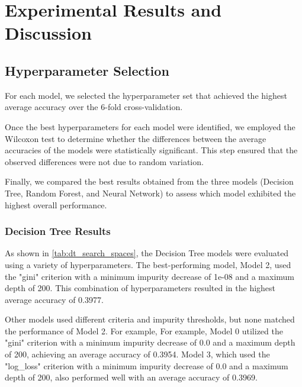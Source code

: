 \section{Experimental Results and Discussion}

\subsection{Hyperparameter Selection}

For each model, we selected the hyperparameter set 
that achieved the highest average accuracy 
over the 6-fold cross-validation. 

Once the best hyperparameters for each model were 
identified, we employed the Wilcoxon test to determine 
whether the differences between the average accuracies 
of the models were statistically significant. 
This step ensured that the observed differences 
were not due to random variation. 

Finally, we compared the best results obtained from 
the three models (Decision Tree, Random Forest, and Neural Network) 
to assess which model exhibited the 
highest overall performance.

\subsubsection{Decision Tree Results}

As shown in \autoref{tab:dt_search_spaces}, 
the Decision Tree models were evaluated using a 
variety of hyperparameters. The best-performing model, 
Model 2, used the "gini" criterion with a minimum 
impurity decrease of 1e-08 and a maximum depth of 200. 
This combination of hyperparameters resulted in the 
highest average accuracy of 0.3977.

Other models used different criteria and impurity 
thresholds, but none matched the performance of Model 2. 
For example, For example, Model 0 utilized the "gini" 
criterion with a minimum impurity decrease of 0.0 and 
a maximum depth of 200, achieving an average accuracy 
of 0.3954. Model 3, which used the "log\_loss" criterion 
with a minimum impurity decrease of 0.0 and a maximum 
depth of 200, also performed well with an average 
accuracy of 0.3969.

